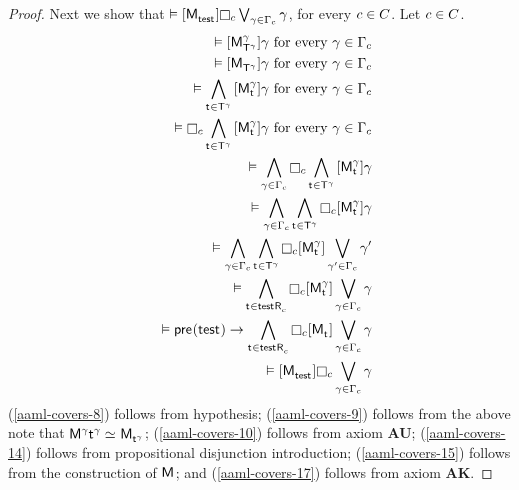 \begin{proof}
Next we show that $\entails \actionA{\aPModel{\aStateTest}} \necessaryC \bigvee_{\gamma \in \Gamma_\agentC} \gamma$, for every $c \in C$.
Let $c \in C$.
\begin{eqnarray}
    && \entails \actionA{\aPModel[\gamma]{\aStatesT[\gamma]}} \gamma \text{ for every } \gamma \in \Gamma_\agentC \label{aaml-covers-8}\\
    && \entails \actionA{\aPModel{\aStatesT[\gamma]}} \gamma \text{ for every } \gamma \in \Gamma_\agentC \label{aaml-covers-9}\\
    && \entails \bigwedge_{\aStateT \in \aStatesT[\gamma]} \actionA{\aPModel[\gamma]{\aStateT}} \gamma \text{ for every } \gamma \in \Gamma_\agentC \label{aaml-covers-10}\\
    && \entails \necessaryC \bigwedge_{\aStateT \in \aStatesT[\gamma]} \actionA{\aPModel[\gamma]{\aStateT}} \gamma \text{ for every } \gamma \in \Gamma_\agentC \label{aaml-covers-11}\\
    && \entails \bigwedge_{\gamma \in \Gamma_\agentC} \necessaryC \bigwedge_{\aStateT \in \aStatesT[\gamma]} \actionA{\aPModel[\gamma]{\aStateT}} \gamma \label{aaml-covers-12}\\
    && \entails \bigwedge_{\gamma \in \Gamma_\agentC} \bigwedge_{\aStateT \in \aStatesT[\gamma]} \necessaryC \actionA{\aPModel[\gamma]{\aStateT}} \gamma \label{aaml-covers-13}\\
    && \entails \bigwedge_{\gamma \in \Gamma_\agentC} \bigwedge_{\aStateT \in \aStatesT[\gamma]} \necessaryC \actionA{\aPModel[\gamma]{\aStateT}} \bigvee_{\gamma' \in \Gamma_\agentC} \gamma' \label{aaml-covers-14}\\
    && \entails \bigwedge_{\aStateT \in \aSuccessorsC{\aStateTest}} \necessaryC \actionA{\aPModel[\gamma]{\aStateT}} \bigvee_{\gamma \in \Gamma_\agentC} \gamma \label{aaml-covers-15}\\
    && \entails \aPrecondition(\aStateTest) \implies \bigwedge_{\aStateT \in \aSuccessorsC{\aStateTest}} \necessaryC \actionA{\aPModel{\aStateT}} \bigvee_{\gamma \in \Gamma_\agentC} \gamma \label{aaml-covers-16}\\
    && \entails \actionA{\aPModel{\aStateTest}} \necessaryC \bigvee_{\gamma \in \Gamma_\agentC} \gamma \label{aaml-covers-17}
\end{eqnarray}
(\ref{aaml-covers-8}) follows from hypothesis;
(\ref{aaml-covers-9}) follows from the above note that $\aModel[\gamma]{\aStateT[\gamma]} \bisimilar \aPModel{\aStateT[\gamma]}$;
(\ref{aaml-covers-10}) follows from \axiomAamlK{} axiom {\bf AU};
(\ref{aaml-covers-14}) follows from propositional disjunction introduction;
(\ref{aaml-covers-15}) follows from the construction of $\aModel$; and
(\ref{aaml-covers-17}) follows from \axiomAamlK{} axiom {\bf AK}.


\end{proof}
